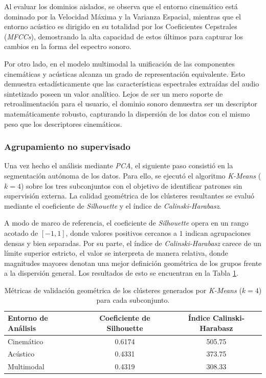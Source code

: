 Al evaluar los dominios aislados, se observa que el entorno cinemático está dominado por la Velocidad Máxima y la Varianza Espacial, mientras que el entorno acústico es dirigido en su totalidad por los Coeficientes Cepstrales (\textit{MFCCs}), demostrando la alta capacidad de estos últimos para capturar los cambios en la forma del espectro sonoro.


Por otro lado, en el modelo multimodal la unificación de las componentes cinemáticas y acústicas alcanza un grado de representación equivalente. Esto demuestra estadísticamente que las características espectrales extraídas del audio sintetizado poseen un valor analítico. Lejos de ser un mero soporte de retroalimentación para el usuario, el dominio sonoro demuestra ser un descriptor matemáticamente robusto, capturando la dispersión de los datos con el mismo peso que los descriptores cinemáticos.

\subsubsection{Agrupamiento no supervisado}

Una vez hecho el análisis mediante \textit{PCA}, el siguiente paso consistió en la segmentación autónoma de los datos. Para ello, se ejecutó el algoritmo \textit{K-Means} ($k=4$) sobre los tres subconjuntos con el objetivo de identificar patrones sin supervisión externa. La calidad geométrica de los clústeres resultantes se evaluó mediante el coeficiente de \textit{Silhouette} y el índice de \textit{Calinski-Harabasz}. 

A modo de marco de referencia, el coeficiente de \textit{Silhouette} opera en un rango acotado de $[-1, 1]$, donde valores positivos cercanos a $1$ indican agrupaciones densas y bien separadas. Por su parte, el índice de \textit{Calinski-Harabasz} carece de un límite superior estricto, el valor se interpreta de manera relativa, donde magnitudes mayores denotan una mejor definición geométrica de los grupos frente a la dispersión general. Los resultados de esto se encuentran en la Tabla \ref{tab:metricas_kmeans}.

\begin{table}[H]
\centering
\caption{Métricas de validación geométrica de los clústeres generados por \textit{K-Means} ($k=4$) para cada subconjunto.}
\label{tab:metricas_kmeans}
\begin{tabular}{lcc}
\hline
\textbf{Entorno de Análisis} & \textbf{Coeficiente de Silhouette} & \textbf{Índice Calinski-Harabasz} \\ \hline
Cinemático & 0.6174 & 505.75 \\
Acústico & 0.4331 & 373.75 \\
Multimodal & 0.4319 & 308.33 \\ \hline
\end{tabular}
\end{table}


